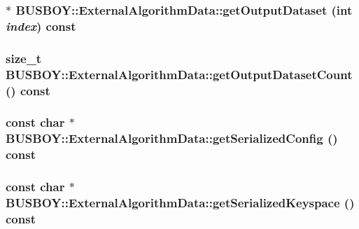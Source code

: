 \label{classBUSBOY_1_1ExternalAlgorithmData_a077b4e0b405fe7332c95f47879eec165}
\hypertarget{classBUSBOY_1_1ExternalAlgorithmData_a23a9764c4207820bc823cdd18a57b1e8}{
\subsubsection[{getOutputDataset}]{ $\ast$ BUSBOY::ExternalAlgorithmData::getOutputDataset (int {\em index}) const}}
\label{classBUSBOY_1_1ExternalAlgorithmData_a23a9764c4207820bc823cdd18a57b1e8}
\hypertarget{classBUSBOY_1_1ExternalAlgorithmData_ab7d6f55877b974715fe830df4c1820f3}{
\subsubsection[{getOutputDatasetCount}]{\setlength{\rightskip}{0pt plus 5cm}size\_\-t BUSBOY::ExternalAlgorithmData::getOutputDatasetCount () const}}
\label{classBUSBOY_1_1ExternalAlgorithmData_ab7d6f55877b974715fe830df4c1820f3}
\hypertarget{classBUSBOY_1_1ExternalAlgorithmData_ad1fb4f6f044c40c4c111594fb0358991}{
\subsubsection[{getSerializedConfig}]{\setlength{\rightskip}{0pt plus 5cm}const char $\ast$ BUSBOY::ExternalAlgorithmData::getSerializedConfig () const}}
\label{classBUSBOY_1_1ExternalAlgorithmData_ad1fb4f6f044c40c4c111594fb0358991}
\hypertarget{classBUSBOY_1_1ExternalAlgorithmData_a93aacf007a373effdc54ebc4dfd8bc62}{
\subsubsection[{getSerializedKeyspace}]{\setlength{\rightskip}{0pt plus 5cm}const char $\ast$ BUSBOY::ExternalAlgorithmData::getSerializedKeyspace () const}}
